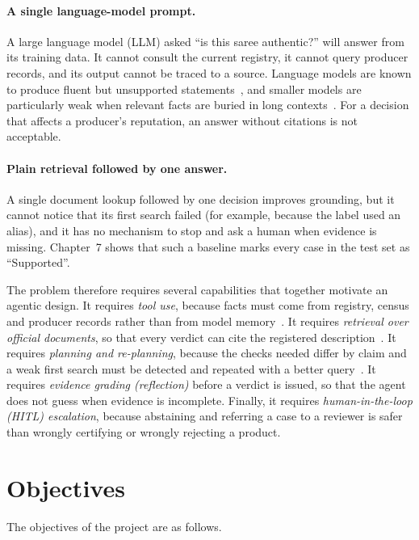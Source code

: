 \paragraph{A single language-model prompt.} A large language model (LLM) asked ``is this saree
authentic?'' will answer from its training data. It cannot consult the current registry, it cannot
query producer records, and its output cannot be traced to a source. Language models are known to
produce fluent but unsupported statements~\cite{ji2023hallucination}, and smaller models are
particularly weak when relevant facts are buried in long contexts~\cite{liu2024lost}. For a decision
that affects a producer's reputation, an answer without citations is not acceptable.

\paragraph{Plain retrieval followed by one answer.} A single document lookup followed by one decision
improves grounding, but it cannot notice that its first search failed (for example, because the label
used an alias), and it has no mechanism to stop and ask a human when evidence is missing. Chapter~7
shows that such a baseline marks every case in the test set as ``Supported''.

The problem therefore requires several capabilities that together motivate an agentic design. It
requires \emph{tool use}, because facts must come from registry, census and producer records rather
than from model memory~\cite{schick2023toolformer}. It requires \emph{retrieval over official
documents}, so that every verdict can cite the registered description~\cite{lewis2020rag}. It requires
\emph{planning and re-planning}, because the checks needed differ by claim and a weak first search must
be detected and repeated with a better query~\cite{yan2024crag}. It requires \emph{evidence grading
(reflection)} before a verdict is issued, so that the agent does not guess when evidence is incomplete.
Finally, it requires \emph{human-in-the-loop (HITL) escalation}, because abstaining and referring a case
to a reviewer is safer than wrongly certifying or wrongly rejecting a product.

\section{Objectives}

The objectives of the project are as follows.

